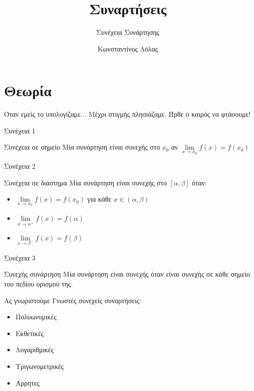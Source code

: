\documentclass{presentation}
\title{Συναρτήσεις}
\subtitle{Συνέχεια Συνάρτησης}
\author[Λόλας]{Κωνσταντίνος Λόλας}
\begin{document}
\begin{frame}
  \titlepage
\end{frame}

\section{Θεωρία}
\begin{frame}{Όταν εμείς το υπολογίζαμε...}
  Μέχρι στιγμής πλησιάζαμε. Ήρθε ο καιρός να φτάσουμε!
\end{frame}

\begin{frame}{Συνέχεια 1}
  \begin{block}{Συνέχεια σε σημείο}
    Μία συνάρτηση είναι συνεχής στο $x_0$ αν $\lim\limits_{x \to x_0}{ f(x) }=f(x_0)$
  \end{block}
\end{frame}

\begin{frame}{Συνέχεια 2}
  \begin{block}{Συνέχεια σε διάστημα}
    Μία συνάρτηση είναι συνεχής στο $[α,β]$ όταν:
    \begin{itemize}
      \item $\lim\limits_{x \to x_0}{ f(x) }=f(x_0)$ για κάθε $x\in (α,β)$
      \item $\lim\limits_{x \to α^+}{ f(x) }=f(α)$
      \item $\lim\limits_{x \to β^-}{ f(x) }=f(β)$
    \end{itemize}
  \end{block}
\end{frame}

\begin{frame}{Συνέχεια 3}
  \begin{block}{Συνεχής συνάρτηση}
    Μία συνάρτηση είναι συνεχής όταν είναι συνεχής σε κάθε σημείο του πεδίου ορισμού της.
  \end{block}
\end{frame}

\begin{frame}{Ας γνωριστούμε}
  Γνωστές συνεχείς συναρτήσεις:
  \begin{itemize}[<+-|alert@+>]
    \item Πολυωνυμικές
    \item Εκθετικές
    \item Λογαριθμικές
    \item Τριγωνομετρικές
    \item Άρρητες
  \end{itemize}
\end{frame}
\end{document}
